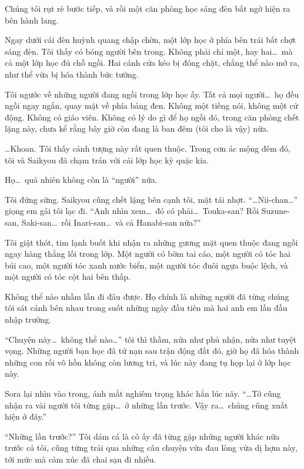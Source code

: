 \documentclass[../main.tex]{subfiles}
\begin{document}
Chúng tôi rụt rè bước tiếp, và rồi một căn phòng học sáng đèn bất ngờ hiện ra bên hành lang.

Ngay dưới cái đèn huỳnh quang chập chờn, một lớp học ở phía bên trái bất chợt sáng đèn. Tôi thấy có bóng người bên trong. Không phải chỉ một, hay hai\dots\ mà cả một lớp học đủ chỗ ngồi. Hai cánh cửa kéo bị đóng chặt, chẳng thể nào mở ra, như thể vừa bị hóa thành bức tường.


Tôi ngước về những người đang ngồi trong lớp học ấy. Tất cả mọi người\dots\ họ đều ngồi ngay ngắn, quay mặt về phía bảng đen. Không một tiếng nói, không một cử động. Không có giáo viên. Không có lý do gì để họ ngồi đó, trong căn phòng chết lặng này, chưa kể rằng bây giờ còn đang là ban đêm (tôi cho là vậy) nữa.

\dots Khoan. Tôi thấy cảnh tượng này rất quen thuộc. Trong cơn ác mộng đêm đó, tôi và Saikyou đã chạm trán với cái lớp học kỳ quặc kia.

Họ\dots\ quả nhiên không còn là ``người'' nữa.

Tôi đứng sững. Saikyou cũng chết lặng bên cạnh tôi, mặt tái nhợt. ``\dots Nii-chan\dots'' giọng em gái tôi lạc đi. ``Anh nhìn xem\dots\ đó có phải\dots\ Touka-san? Rồi Suzune-san, Saki-san\dots\ rồi Inari-san\dots\ và cả Hanabi-san nữa?''

Tôi giật thót, tim lạnh buốt khi nhận ra những gương mặt quen thuộc đang ngồi ngay hàng thẳng lối trong lớp. Một người có bờm tai cáo, một người có tóc hai búi cao, một người tóc xanh nước biển, một người tóc đuôi ngựa buộc lệch, và một người có tóc cột hai bên thấp.

Không thể nào nhầm lẫn đi đâu được. Họ chính là những người đã từng chúng tôi sát cánh bên nhau trong suốt những ngày đầu tiên mà hai anh em lần đầu nhập trường.

``Chuyện này\dots\ không thể nào\dots'' tôi thì thầm, nửa như phủ nhận, nửa như tuyệt vọng. Những người bạn học đã tử nạn sau trận động đất đó, giờ họ đã hóa thành những con rối vô hồn không còn lương tri, và lúc này đang tụ họp lại ở lớp học này.

Sora lại nhìn vào trong, ánh mắt nghiêm trọng khác hẳn lúc nãy. ``\dots Tớ cũng nhận ra vài người tôi từng gặp\dots\ ở những lần trước. Vậy ra\dots\ chúng cũng xuất hiện ở đây.''

``Những lần trước?'' Tôi dám cá là cô ấy đã từng gặp những người khác nữa trước cả tôi, cũng từng trải qua những câu chuyện vừa đau lòng vừa dị hợm này, tới mức mà cảm xúc đã chai sạn đi nhiều.
\end{document}
